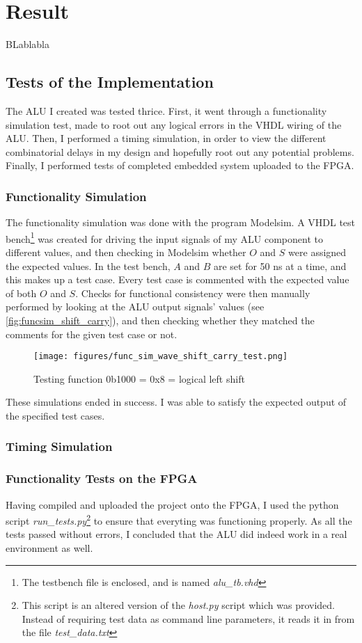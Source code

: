 \documentclass{article}
\begin{document}
\section{Result}
\label{sec:result}
BLablabla
\subsection{Tests of the Implementation}
\label{subsec:tests}
The ALU I created was tested thrice. First, it went through a functionality simulation test, made to root out any logical errors in the VHDL wiring of the ALU. Then, I performed a timing simulation, in order to view the different combinatorial delays in my design and hopefully root out any potential problems. Finally, I performed tests of completed embedded system uploaded to the FPGA. 
\subsubsection{Functionality Simulation}
\label{subsubsec:funcsim}
The functionality simulation was done with the program Modelsim. A VHDL test bench\footnote{The testbench file is enclosed, and is named \emph{alu\_tb.vhd}} was created for driving the input signals of my ALU component to different values, and then checking in Modelsim whether $O$ and $S$ were assigned the expected values. In the test bench, $A$ and $B$ are set for 50 ns at a time, and this makes up a test case. Every test case is commented with the expected value of both $O$ and $S$. Checks for functional consistency were then manually performed by looking at the ALU output signals' values (see \autoref{fig:funcsim_shift_carry}), and then checking whether they matched the comments for the given test case or not. 
\begin{figure}[htbp]
  \centering
  \texttt{[image: figures/func\_sim\_wave\_shift\_carry\_test.png]}
  \caption{\label{fig:funcsim_shift_carry} Testing function 0b1000 = 0x8 = logical left shift}
\end{figure}

These simulations ended in success. I was able to satisfy the expected output of the specified test cases.

\subsubsection{Timing Simulation}
\label{subsubsec:timingsim}

\subsubsection{Functionality Tests on the FPGA}
\label{subsubsec:funcfpga}
Having compiled and uploaded the project onto the FPGA, I used the python script \emph{run\_tests.py}\footnote{This script is an altered version of the \emph{host.py} script which was provided. Instead of requiring test data as command line parameters, it reads it in from the file \emph{test\_data.txt}} to ensure that everyting was functioning properly. As all the tests passed without errors, I concluded that the ALU did indeed work in a real environment as well.
\end{document}
